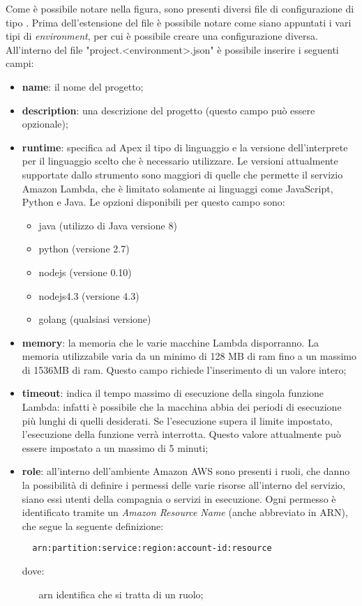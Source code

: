 Come è possibile notare nella figura, sono presenti diversi file di
configurazione di tipo . Prima
dell'estensione del file è possibile notare come siano appuntati i vari tipi di
\textit{environment}, per cui è possibile creare una configurazione diversa.
All'interno del file "project.<environment>.json" è possibile inserire i
seguenti campi:
\begin{itemize}
  \item \textbf{name}: il nome del progetto;
  \item \textbf{description}: una descrizione del progetto (questo campo può
essere opzionale);
  \item \textbf{runtime}: specifica ad Apex il tipo di linguaggio e la versione
dell'interprete per il linguaggio scelto che è necessario utilizzare. Le
versioni attualmente supportate dallo strumento sono maggiori di quelle che
permette il servizio Amazon Lambda, che è limitato solamente ai linguaggi come
JavaScript, Python e Java. Le opzioni disponibili per questo campo sono:
  \begin{itemize}
    \item java (utilizzo di Java versione 8)
    \item python (versione 2.7)
    \item nodejs (versione 0.10)
    \item nodejs4.3 (versione 4.3)
    \item golang (qualsiasi versione)
  \end{itemize}

  \item \textbf{memory}: la memoria che le varie macchine Lambda disporranno.
La memoria utilizzabile varia da un minimo di 128 MB di \gls{ram} fino a un
massimo di 1536MB di \gls{ram}. Questo campo richiede l'inserimento di un
valore intero;

  \item \textbf{timeout}: indica il tempo massimo di esecuzione della singola
funzione Lambda: infatti è possibile che la macchina abbia dei periodi di
esecuzione più lunghi di quelli desiderati. Se l'esecuzione supera il limite
impostato, l'esecuzione della funzione verrà interrotta. Questo valore
attualmente può essere impostato a un massimo di 5 minuti;

  \item \textbf{role}: all'interno dell'ambiente Amazon AWS sono presenti i
ruoli, che danno la possibilità di definire i permessi delle varie risorse
all'interno del servizio, siano essi utenti della compagnia o servizi in
esecuzione. Ogni permesso è identificato tramite un \textit{Amazon Resource
Name} (anche abbreviato in ARN), che segue la seguente definizione:
\begin{verbatim}
  arn:partition:service:region:account-id:resource
\end{verbatim}
dove:
  \begin{itemize}
    \item[arn] identifica che si tratta di un ruolo;


\end{itemize}
\end{itemize}
